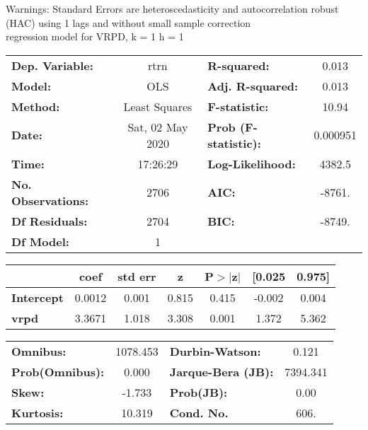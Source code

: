 Warnings: \newline
 [1] Standard Errors are heteroscedasticity and autocorrelation robust (HAC) using 1 lags and without small sample correction\\ 

regression model for VRPD, k = 1 h = 1\begin{center}
\begin{tabular}{lclc}
\toprule
\textbf{Dep. Variable:}    &       rtrn       & \textbf{  R-squared:         } &     0.013   \\
\textbf{Model:}            &       OLS        & \textbf{  Adj. R-squared:    } &     0.013   \\
\textbf{Method:}           &  Least Squares   & \textbf{  F-statistic:       } &     10.94   \\
\textbf{Date:}             & Sat, 02 May 2020 & \textbf{  Prob (F-statistic):} &  0.000951   \\
\textbf{Time:}             &     17:26:29     & \textbf{  Log-Likelihood:    } &    4382.5   \\
\textbf{No. Observations:} &        2706      & \textbf{  AIC:               } &    -8761.   \\
\textbf{Df Residuals:}     &        2704      & \textbf{  BIC:               } &    -8749.   \\
\textbf{Df Model:}         &           1      & \textbf{                     } &             \\
\bottomrule
\end{tabular}
\begin{tabular}{lcccccc}
                   & \textbf{coef} & \textbf{std err} & \textbf{z} & \textbf{P$> |$z$|$} & \textbf{[0.025} & \textbf{0.975]}  \\
\midrule
\textbf{Intercept} &       0.0012  &        0.001     &     0.815  &         0.415        &       -0.002    &        0.004     \\
\textbf{vrpd}      &       3.3671  &        1.018     &     3.308  &         0.001        &        1.372    &        5.362     \\
\bottomrule
\end{tabular}
\begin{tabular}{lclc}
\textbf{Omnibus:}       & 1078.453 & \textbf{  Durbin-Watson:     } &    0.121  \\
\textbf{Prob(Omnibus):} &   0.000  & \textbf{  Jarque-Bera (JB):  } & 7394.341  \\
\textbf{Skew:}          &  -1.733  & \textbf{  Prob(JB):          } &     0.00  \\
\textbf{Kurtosis:}      &  10.319  & \textbf{  Cond. No.          } &     606.  \\
\bottomrule
\end{tabular}
\end{center}

